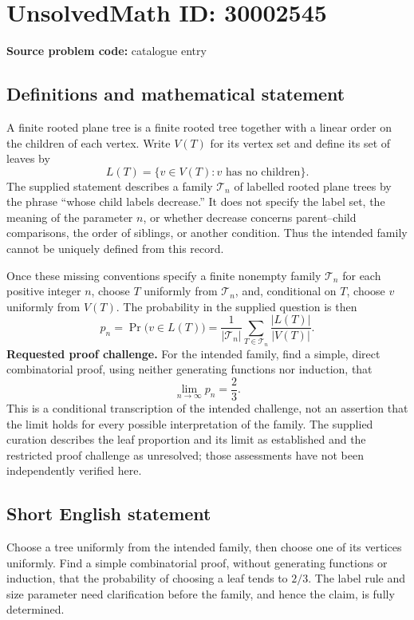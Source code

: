 \documentclass[11pt]{article}
\begin{document}
\section*{UnsolvedMath ID: 30002545}
\textbf{Source problem code:} catalogue entry
\subsection{Definitions and mathematical statement}
A finite rooted plane tree is a finite rooted tree together with a linear order on the children of each vertex. Write \(V(T)\) for its vertex set and define its set of leaves by
\[
L(T)=\{v\in V(T):v\text{ has no children}\}.
\]
The supplied statement describes a family \(\mathcal T_n\) of labelled rooted plane trees by the phrase ``whose child labels decrease.'' It does not specify the label set, the meaning of the parameter \(n\), or whether decrease concerns parent--child comparisons, the order of siblings, or another condition. Thus the intended family cannot be uniquely defined from this record.

Once these missing conventions specify a finite nonempty family \(\mathcal T_n\) for each positive integer \(n\), choose \(T\) uniformly from \(\mathcal T_n\), and, conditional on \(T\), choose \(v\) uniformly from \(V(T)\). The probability in the supplied question is then
\[
p_n=\Pr\bigl(v\in L(T)\bigr)
=\frac{1}{|\mathcal T_n|}\sum_{T\in\mathcal T_n}\frac{|L(T)|}{|V(T)|}.
\]
\textbf{Requested proof challenge.} For the intended family, find a simple, direct combinatorial proof, using neither generating functions nor induction, that
\[
\lim_{n\to\infty}p_n=\frac23.
\]
This is a conditional transcription of the intended challenge, not an assertion that the limit holds for every possible interpretation of the family. The supplied curation describes the leaf proportion and its limit as established and the restricted proof challenge as unresolved; those assessments have not been independently verified here.
\subsection{Short English statement}
Choose a tree uniformly from the intended family, then choose one of its vertices uniformly. Find a simple combinatorial proof, without generating functions or induction, that the probability of choosing a leaf tends to \(2/3\). The label rule and size parameter need clarification before the family, and hence the claim, is fully determined.
\end{document}
